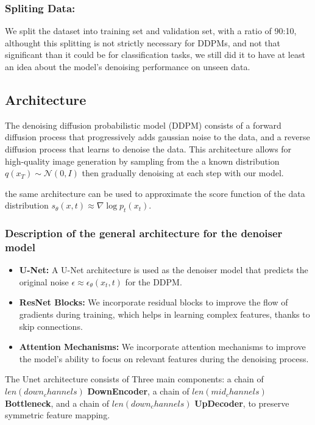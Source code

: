 \documentclass[twocolumn,superscriptaddress,aps]{revtex4-1}
\begin{document}
\subsubsection{Spliting Data:}\label{split_data}
We split the dataset into training set and validation set, with a ratio of 90:10, althought this splitting is not strictly necessary for DDPMs, and not that significant than it could be for classification tasks, we still did it to have at least an idea about the model's denoising performance on unseen data.

\subsection{Architecture}
The denoising diffusion probabilistic model (DDPM) consists of a forward diffusion process that progressively adds gaussian noise to the data, and a reverse diffusion process that learns to denoise the data. This architecture allows for high-quality image generation by sampling from the a known distribution $q(x_T) \sim \mathcal{N}(0, I)$ then gradually denoising at each step with our model.

the same architecture can be used to approximate the score function of the data distribution $s_\theta(x , t) \approx \nabla \log p_t(x_t)$.

\subsubsection{Description of the general architecture for the denoiser model}

\begin{itemize}
	\item \textbf{U-Net:} A U-Net architecture is used as the denoiser model that predicts the original noise $\epsilon \approx\epsilon_\theta(x_t, t)$ for the DDPM.
	\item \textbf{ResNet Blocks:} We incorporate residual blocks to improve the flow of gradients during training, which helps in learning complex features, thanks to skip connections.
	\item \textbf{Attention Mechanisms:} We incorporate attention mechanisms to improve the model's ability to focus on relevant features during the denoising process.
\end{itemize}

The Unet architecture consists of Three main components: a chain of $len(down_channels)$ \textbf{DownEncoder}, a chain of $len(mid_channels)$ \textbf{Bottleneck}, and a chain of $len(down_channels)$ \textbf{UpDecoder}, to preserve symmetric feature mapping.
\end{document}
